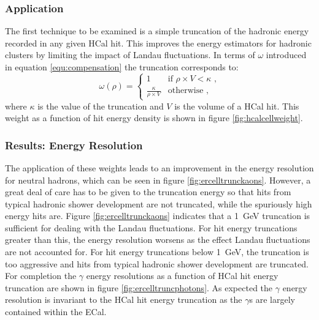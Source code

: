 \subsubsection{Application}
The first technique to be examined is a simple truncation of the hadronic energy recorded in any given HCal hit.  This improves the energy estimators for hadronic clusters by limiting the impact of Landau fluctuations.  In terms of $\omega$ introduced in equation \ref{equ:compensation} the truncation corresponds to:
%
\begin{equation}
\omega(\rho) =
\begin{cases}
1 & \text{if } \rho \times V < \kappa \text{ ,} \\
\frac{\kappa}{\rho \times V} & \text{otherwise} \text{ ,}
\end{cases}
\end{equation}
%
\noindent where $\kappa$ is the value of the truncation and $V$ is the volume of a HCal hit.  This weight as a function of hit energy density is shown in figure \ref{fig:hcalcellweight}.  


\subsubsection{Results: Energy Resolution}
The application of these weights leads to an improvement in the energy resolution for neutral hadrons, which can be seen in figure \ref{fig:ercelltrunckaons}.  However, a great deal of care has to be given to the truncation energy so that hits from typical hadronic shower development are not truncated, while the spuriously high energy hits are.  Figure \ref{fig:ercelltrunckaons} indicates that a 1~GeV truncation is sufficient for dealing with the Landau fluctuations.  For hit energy truncations greater than this, the energy resolution worsens as the effect Landau fluctuations are not accounted for.  For hit energy truncations below 1~GeV, the truncation is too aggressive and hits from typical hadronic shower development are truncated.  For completion the $\gamma$ energy resolutions as a function of HCal hit energy truncation are shown in figure \ref{fig:ercelltruncphotons}.  As expected the $\gamma$ energy resolution is invariant to the HCal hit energy truncation as the $\gamma$s are largely contained within the ECal.

